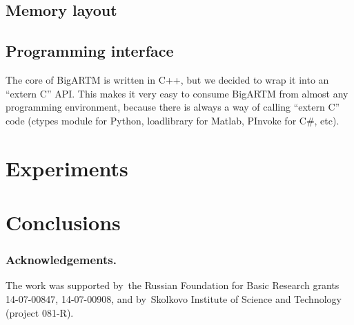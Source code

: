 \documentclass{llncs}
\begin{document}
\subsection{Memory layout}

\subsection{Programming interface}

The core of BigARTM is written in C++, but we decided to wrap it into an ``extern C'' API.
This makes it very easy to consume BigARTM from almost any programming environment,
because there is always a way of calling ``extern C'' code
(ctypes module for Python, loadlibrary for Matlab, PInvoke for C\#, etc).








\section{Experiments}
\label{sec:Experiments}

\section{Conclusions}
\label{sec:Conclusions}

\bigskip
\subsubsection*{Acknowledgements.}
    The work was supported by~the Russian Foundation for Basic Research grants 14-07-00847, 14-07-00908,
    and by~Skolkovo Institute of Science and Technology (project 081-R).

%


\end{document}
